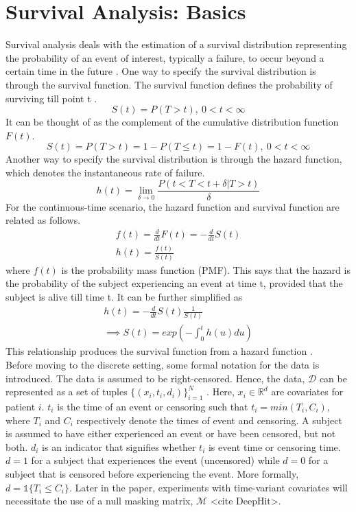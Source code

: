 \documentclass[%
 reprint,
 amsmath,amssymb,
 aps,
]{revtex4-2}
\begin{document}
\section{\label{surv}Survival Analysis: Basics}
Survival analysis deals with the estimation of a survival distribution representing the probability of an event of interest, typically a failure, to occur beyond a certain time in the future \cite{nagpal_deep_2021}. One way to specify the survival distribution is through the survival function. The survival function defines the probability of surviving till point t \cite{Moore_2016}.
\[
S(t) = P(T>t), \ 0 < t <  \infty
\]
It can be thought of as the complement of the cumulative distribution function $F(t)$.
\[
S(t) = P(T>t) = 1 - P(T\le t) = 1 - F(t), \ 0 < t <  \infty
\]
Another way to specify the survival distribution is through the hazard function, which denotes the instantaneous rate of failure.
\[
h(t) = \lim_{\delta\to0}\frac{P(t<T<t+\delta|T>t)}{\delta}
\]
For the continuous-time scenario, the hazard function and survival function are related as follows. 
\begin{gather*}
f(t) = \frac{d}{dt}F(t) = -\frac{d}{dt}S(t)\\
h(t) = \frac{f(t)}{S(t)} 
\end{gather*}
where $f(t)$ is the probability mass function (PMF). This says that the hazard is the probability of the subject experiencing an event at time t, provided that the subject is alive till time t. It can be further simplified as
\begin{gather*}
h(t) = -\frac{d}{dt}S(t)\frac{1}{S(t)}\\
\implies S(t) = exp\left (- \int_{0}^{t}h(u)du\right)
\end{gather*}
This relationship produces the survival function from a hazard function \cite{Moore_2016}.\\

Before moving to the discrete setting, some formal notation for the data is introduced. The data is assumed to be right-censored. Hence, the data, $\mathcal{D}$ can be represented as a set of tuples $\{(x_i , t_i , d_i)\}_{i=1}^{N}$  \cite{nagpal_deep_2021}. Here, $x_i \in \mathbb{R}^d$ are covariates for patient $i$. $t_i$ is the time of an event or censoring such that $t_i = min(T_i, C_i)$, where $T_i$ and $C_i$ respectively denote the times of event and censoring. A subject is assumed to have either experienced an event or have been censored, but not both. $d_i$ is an indicator that signifies whether $t_i$ is event time or censoring time. $d=1$ for a subject that experiences the event (uncensored) while $d=0$ for a subject that is censored before experiencing the event. More formally, $d= \mathbb{1}\{T_i \le C_i\}$. Later in the paper, experiments with time-variant covariates will necessitate the use of a null masking matrix, $\mathcal{M}$ <cite DeepHit>.\\
\end{document}
